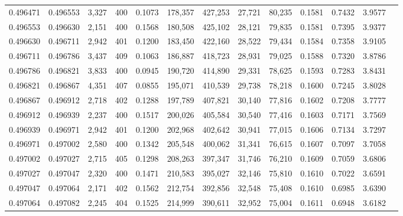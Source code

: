 \begin{tabular}{rrrrrrrrrrrrr}
0.496471 & 0.496553 & 3,327 & 400 &                                     0.1073 & 178,357 & 427,253 &  27,721 &  80,235 & 0.1581 & 0.7432 & 3.9577 \\
0.496553 & 0.496630 & 2,151 & 400 &                                     0.1568 & 180,508 & 425,102 &  28,121 &  79,835 & 0.1581 & 0.7395 & 3.9377 \\
0.496630 & 0.496711 & 2,942 & 401 &                                     0.1200 & 183,450 & 422,160 &  28,522 &  79,434 & 0.1584 & 0.7358 & 3.9105 \\
0.496711 & 0.496786 & 3,437 & 409 &                                     0.1063 & 186,887 & 418,723 &  28,931 &  79,025 & 0.1588 & 0.7320 & 3.8786 \\
0.496786 & 0.496821 & 3,833 & 400 &                                     0.0945 & 190,720 & 414,890 &  29,331 &  78,625 & 0.1593 & 0.7283 & 3.8431 \\
0.496821 & 0.496867 & 4,351 & 407 &                                     0.0855 & 195,071 & 410,539 &  29,738 &  78,218 & 0.1600 & 0.7245 & 3.8028 \\
0.496867 & 0.496912 & 2,718 & 402 &                                     0.1288 & 197,789 & 407,821 &  30,140 &  77,816 & 0.1602 & 0.7208 & 3.7777 \\
0.496912 & 0.496939 & 2,237 & 400 &                                     0.1517 & 200,026 & 405,584 &  30,540 &  77,416 & 0.1603 & 0.7171 & 3.7569 \\
0.496939 & 0.496971 & 2,942 & 401 &                                     0.1200 & 202,968 & 402,642 &  30,941 &  77,015 & 0.1606 & 0.7134 & 3.7297 \\
0.496971 & 0.497002 & 2,580 & 400 &                                     0.1342 & 205,548 & 400,062 &  31,341 &  76,615 & 0.1607 & 0.7097 & 3.7058 \\
0.497002 & 0.497027 & 2,715 & 405 &                                     0.1298 & 208,263 & 397,347 &  31,746 &  76,210 & 0.1609 & 0.7059 & 3.6806 \\
0.497027 & 0.497047 & 2,320 & 400 &                                     0.1471 & 210,583 & 395,027 &  32,146 &  75,810 & 0.1610 & 0.7022 & 3.6591 \\
0.497047 & 0.497064 & 2,171 & 402 &                                     0.1562 & 212,754 & 392,856 &  32,548 &  75,408 & 0.1610 & 0.6985 & 3.6390 \\
0.497064 & 0.497082 & 2,245 & 404 &                                     0.1525 & 214,999 & 390,611 &  32,952 &  75,004 & 0.1611 & 0.6948 & 3.6182 \\

\end{tabular}
